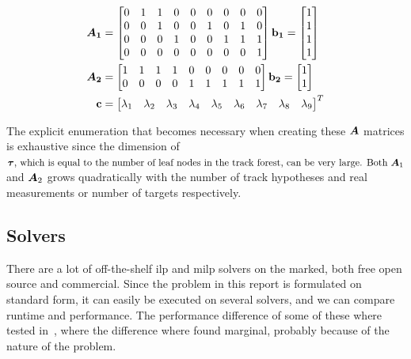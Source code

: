 \begin{equation}
\begin{split}
\bm{A_1} &=\begin{bmatrix}
		0 & 1 & 1 & 0 & 0 & 0 & 0 & 0 & 0 \\
       	0 & 0 & 1 & 0 & 0 & 1 & 0 & 1 & 0 \\
       	0 & 0 & 0 & 1 & 0 & 0 & 1 & 1 & 1 \\
       	0 & 0 & 0 & 0 & 0 & 0 & 0 & 0 & 1 \\
     	\end{bmatrix}
\boldsymbol{\mathbf{b_1}} = 	\begin{bmatrix}
			1 \\ 1  \\ 1 \\ 1
			\end{bmatrix} \\
\bm{A_2} &=\begin{bmatrix}
		1 & 1 & 1 & 1 & 0 & 0 & 0 & 0 & 0 \\
       	0 & 0 & 0 & 0 & 1 & 1 & 1 & 1 & 1 \\
     	\end{bmatrix} 
\boldsymbol{\mathbf{b_2}} = 	\begin{bmatrix}
			1 \\ 1
			\end{bmatrix} \\
\boldsymbol{\mathbf{c}} &=\begin{bmatrix}
		\lambda_1 & \lambda_2 & \lambda_3 & \lambda_4 & \lambda_5 & \lambda_6 & \lambda_7 & \lambda_8 & \lambda_9
		\end{bmatrix}^T \\
\end{split}
\label{eq:example_matrices}
\end{equation}

The explicit enumeration that becomes necessary when creating these \(\bm{A}\) matrices is exhaustive since the dimension of \(\V{\tau}$, which is equal to the number of leaf nodes in the track forest, can be very large. Both \(\M{A}_1\) and \(\bm{A}_2\) grows quadratically with the number of track hypotheses and real measurements or number of targets respectively.

\subsection{Solvers}
There are a lot of off-the-shelf \gls{ilp} and \gls{milp} solvers on the marked, both free open source and commercial. Since the problem in this report is formulated on standard form, it can easily be executed on several solvers, and we can compare runtime and performance. The performance difference of some of these where tested in~\cite{Liland_2017}, where the difference where found marginal, probably because of the nature of the problem. %


